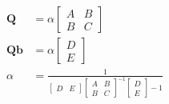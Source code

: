 \begin{equation*}
    \begin{aligned}
        \mathbf{Q}&=\alpha\begin{bmatrix}
        A & B\\ B & C
    \end{bmatrix}\\
    \mathbf{Q}\mathbf{b}&=\alpha\begin{bmatrix}
        D\\E
    \end{bmatrix}\\
    \alpha&=\frac{1}{\begin{bmatrix}
        D & E
    \end{bmatrix}\begin{bmatrix}
        A & B \\ B & C
    \end{bmatrix}^{-1}\begin{bmatrix}
        D \\ E
    \end{bmatrix}-1}
    \end{aligned}
\end{equation*}

